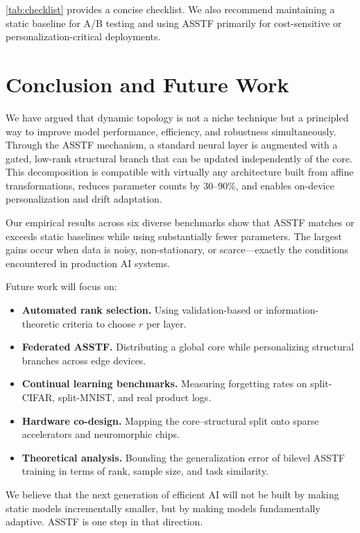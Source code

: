 \documentclass[11pt,a4paper]{article}
\theoremstyle{definition}
\begin{document}
\cref{tab:checklist} provides a concise checklist. We also recommend maintaining a static baseline for A/B testing and using ASSTF primarily for cost-sensitive or personalization-critical deployments.


\section{Conclusion and Future Work}
\label{sec:conclusion}

We have argued that dynamic topology is not a niche technique but a principled way to improve model performance, efficiency, and robustness simultaneously. Through the ASSTF mechanism, a standard neural layer is augmented with a gated, low-rank structural branch that can be updated independently of the core. This decomposition is compatible with virtually any architecture built from affine transformations, reduces parameter counts by 30--90\%, and enables on-device personalization and drift adaptation.

Our empirical results across six diverse benchmarks show that ASSTF matches or exceeds static baselines while using substantially fewer parameters. The largest gains occur when data is noisy, non-stationary, or scarce---exactly the conditions encountered in production AI systems.

Future work will focus on:
\begin{itemize}
    \item \textbf{Automated rank selection.} Using validation-based or information-theoretic criteria to choose $r$ per layer.
    \item \textbf{Federated ASSTF.} Distributing a global core while personalizing structural branches across edge devices.
    \item \textbf{Continual learning benchmarks.} Measuring forgetting rates on split-CIFAR, split-MNIST, and real product logs.
    \item \textbf{Hardware co-design.} Mapping the core--structural split onto sparse accelerators and neuromorphic chips.
    \item \textbf{Theoretical analysis.} Bounding the generalization error of bilevel ASSTF training in terms of rank, sample size, and task similarity.
\end{itemize}

We believe that the next generation of efficient AI will not be built by making static models incrementally smaller, but by making models fundamentally adaptive. ASSTF is one step in that direction.
\end{document}
